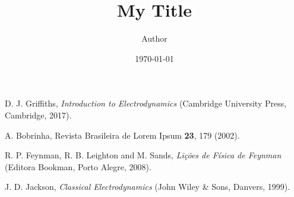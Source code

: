 \documentclass[a4paper, amsfonts, amssymb, amsmath, reprint, showkeys, nofootinbib, twoside]{revtex4-1}
\begin{document}
\title{My Title}

\author{Author}

\date{\today} %

\begin{abstract}
\lipsum[1]
\end{abstract}



\maketitle





\begin{thebibliography}{4}
D. J. Griffiths,
\textit{Introduction to Electrodynamics}
(Cambridge University Press, Cambridge, 2017).

A. Bobrinha,
Revista Brasileira de Lorem Ipsum \textbf{23},
179 (2002).

R. P. Feynman, R. B. Leighton and M. Sands,
\textit{Lições de Física de Feynman}
(Editora Bookman, Porto Alegre, 2008).

J. D. Jackson,
\textit{Classical Electrodynamics}
(John Wiley \& Sons, Danvers, 1999).
\end{thebibliography}

\appendix*

\end{document}
